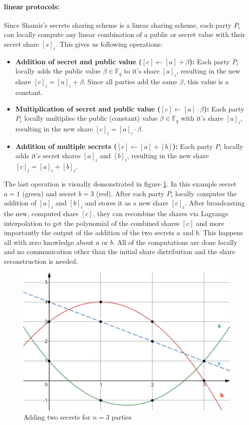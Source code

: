 \paragraph{linear protocols:}
Since Shamir's secrete sharing scheme is a linear sharing scheme, each party $P_i$ can locally compute any linear combination of a public or secret value with their secret share $[s]_i$. This gives us following operations:
\begin{itemize}
  \item \textbf{Addition of secret and public value ($[c] \gets [a] + \beta$):} Each party $P_i$ locally adds the public value $\beta \in \mathbb{F}_q$ to it's share $[a]_i$, resulting in the new share $[c]_i = [a]_i + \beta$. Since all parties add the same $\beta$, this value is a constant.
  \item \textbf{Multiplication of secret and public value ($[c] \gets [a] \cdot \beta$):} Each party $P_i$ locally multiplies the public (constant) value $\beta \in \mathbb{F}_q$ with it's share $[a]_i$, resulting in the new share $[c]_i = [a]_i \cdot \beta$.
  \item \textbf{Addition of multiple secrets ($[c] \gets [a] + [b]$):} Each party $P_i$ locally adds it's secret shares $[a]_i$ and $[b]_i$, resulting in the new share $[c]_i = [a]_i + [b]_i$.
\end{itemize}

The last operation is visually demonstrated in figure \ref{fig:addsecrets}. In this example secret $a=1$ (green) and secret $b=3$ (red). After each party $P_i$ locally computes the addition of $[a]_i$ and $[b]_i$ and stores it as a new share $[c]_i$. After broadcasting the new, computed share $[c]$, they can recombine the shares via Lagrange interpolation to get the polynomial of the combined shares $[c]$ and more importantly the output of the addition of the two secrets $a$ and $b$. This happens all with zero knowledge about $a$ or $b$. All of the computations are done locally and no communication other than the initial share distribution and the share reconstruction is needed.

\begin{figure}
  \includegraphics[width=\linewidth]{plots/addsecrets.png}
  \caption{Adding two secrets for $n=3$ parties}
  \label{fig:addsecrets}
\end{figure}

